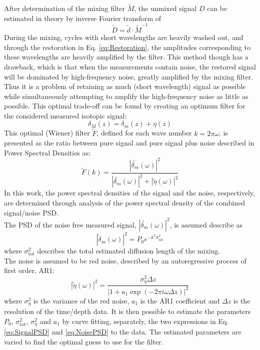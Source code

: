 \documentclass[11pt]{article}
\begin{document}
After determination of the mixing filter $\tilde{M}$, the unmixed signal $D$ can be estimated in theory by inverse Fourier transform of
\begin{equation}
	\tilde{D} = \tilde{d}\cdot\tilde{M}^{-1}
	\label{eq:Restoration}
\end{equation}
During the mixing, cycles with short wavelengths are heavily washed out, and through the restoration in Eq. \ref{eq:Restoration}, the amplitudes corresponding to these wavelengths are heavily amplified by the filter. This method though has a drawback, which is that when the measurements contain noise, the restored signal will be dominated by high-frequency noise, greatly amplified by the mixing filter. Thus it is a problem of retaining as much (short wavelength) signal as possible while simultaneously attempting to amplify the high-frequency noise as little as possible. This optimal trade-off can be found by creating an optimum filter for the considered measured isotopic signal:
\begin{equation}
	\delta_M(z) = \delta_m (z) + \eta(z)
\end{equation} 
This optimal (Wiener) filter $\tilde{F}$, defined for each wave number $k = 2\pi \omega$, is presented as the ratio between pure signal and pure signal plus noise described in Power Spectral Densities as:
\begin{equation}
	\tilde{F}(k) =\frac{|\tilde{\delta_m}(\omega)|^2}{|\tilde{\delta_m}(\omega)|^2 + |\tilde{\eta}(\omega)|^2}
	\label{eq:WienerFilter}
\end{equation}
In this work, the power spectral densities of the signal and the noise, respectively, are determined through analysis of the power spectral density of the combined signal/noise PSD.\\
The PSD of the noise free measured signal, $|\tilde{\delta_m}(\omega)|^2$, is assumed describe as 
\begin{equation}
	|\tilde{\delta}_m(\omega)|^2 = P_0 e^{-k^2 \sigma_{\text{tot}}^2}
	\label{eq:SignalPSD}
\end{equation}
where $\sigma_{\text{tot}}^2$ describes the total estimated diffusion length of the mixing.\\
The noise is assumed to be red noise, described by an autoregressive process of first order, AR1:
\begin{equation}
	|\tilde{\eta}(\omega)|^2 = \frac{\sigma_{\eta}^2 \Delta z}{|1 + a_1 \exp(-2\pi i \omega \Delta z)|^2}
	\label{eq:NoisePSD}
\end{equation}
where $\sigma_{\eta}^2$ is the variance of the red noise, $a_1$ is the AR1 coefficient and $\Delta z$ is the resolution of the time/depth data.
It is then possible to estimate the parameters $P_0$, $\sigma_{\text{tot}}^2$, $\sigma_{\eta}^2$ and $a_1$ by curve fitting, separately, the two expressions in Eq. \ref{eq:SignalPSD} and \ref{eq:NoisePSD} to the data. The estimated parameters are varied to find the optimal guess to use for the filter.
	\newpage


 



\newpage
\end{document}
